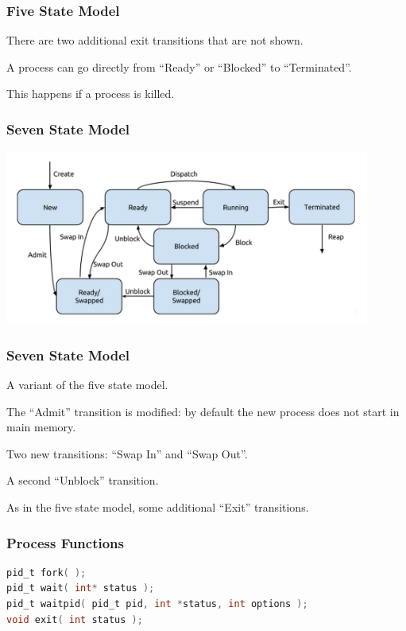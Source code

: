 \begin{frame}
	\frametitle{Five State Model}

	There are two additional exit transitions that are not shown.

	A process can go directly from ``Ready'' or ``Blocked'' to ``Terminated''.

	This happens if a process is killed.

\end{frame}

\begin{frame}
	\frametitle{Seven State Model}

	\begin{center}
		\includegraphics[width=0.9\textwidth]{images/7-state-model.png}
	\end{center}

\end{frame}

\begin{frame}
	\frametitle{Seven State Model}
	A variant of the five state model.

	The ``Admit'' transition is modified: by default the new process does not start in main memory.

	Two new transitions: ``Swap In'' and ``Swap Out''.

	A second ``Unblock'' transition.

	As in the five state model, some additional ``Exit'' transitions.

\end{frame}

\begin{frame}[fragile]
\frametitle{Process Functions}
\begin{lstlisting}[language=C]
pid_t fork( );
pid_t wait( int* status );
pid_t waitpid( pid_t pid, int *status, int options );
void exit( int status );
\end{lstlisting}

\end{frame}

